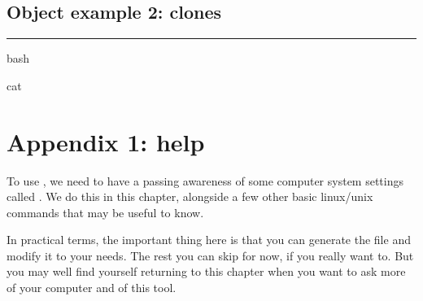 \documentclass[letterpaper,10pt,english]{sphinxmanual}
\begin{document}
\section{Object example 2: clones}
\label{\detokenize{Chapter2:Object-example-2:-clones}}

\bigskip\hrule\bigskip


{
\begin{sphinxVerbatim}[commandchars=\\\{\}]
\llap{\color{nbsphinxin}[ ]:\,\hspace{\fboxrule}\hspace{\fboxsep}}\PYGZpc{}\PYGZpc{}bash

cat 
\end{sphinxVerbatim}
}


\chapter{Appendix 1:  help}
\label{\detokenize{Appendix1:Appendix-1:-bash-help}}\label{\detokenize{Appendix1::doc}}
To use , we need to have a passing awareness of some computer system settings called . We do this in this chapter, alongside a few other basic linux/unix commands that may be useful to know.

In practical terms, the important thing here is that you can generate the file  and modify it to your needs. The rest you can skip for now, if you really want to. But you may well find yourself returning to this chapter when you want to ask more of your computer and of this tool.
\end{document}
